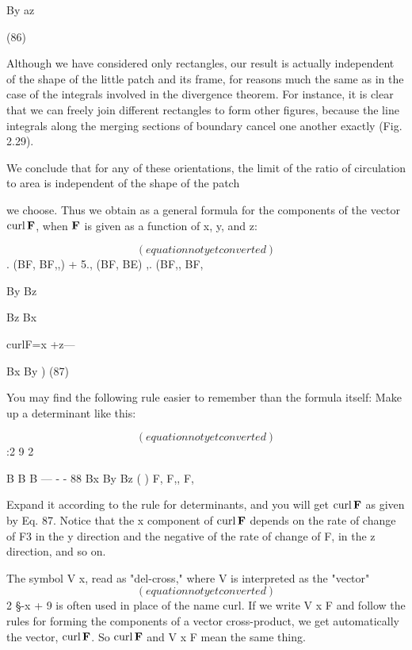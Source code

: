 {By az

(86)

Although we have considered only rectangles, our result is actually
independent of the shape of the little patch and its frame, for reasons
much the same as in the case of the integrals involved in the divergence
theorem. For instance, it is clear that we can freely join different
rectangles to form other figures, because the line integrals
along the merging sections of boundary cancel one another exactly
(Fig. 2.29).

We conclude that for any of these orientations, the limit of the
ratio of circulation to area is independent of the shape of the patch

 

we choose. Thus we obtain as a general formula for the components
of the vector $\operatorname{curl}\mathbf{F}$, when $\mathbf{F}$ is given as a function of x, y, and z:

\begin{equation}
(equation not yet converted)
\end{equation}
. (BF, BF,,) + 5., (BF, BE) ,. (BF,, BF,

By Bz

Bz Bx

curlF=x +z---

Bx By ) (87)

You may find the following rule easier to remember than the formula
itself: Make up a determinant like this:

\begin{equation}
(equation not yet converted)
\end{equation}
:2 9 2

B B B
--- - - 88
Bx By Bz ( )
F, F,, F,

Expand it according to the rule for determinants, and you will get
$\operatorname{curl}\mathbf{F}$ as given by Eq. 87. Notice that the x component of $\operatorname{curl}\mathbf{F}$
depends on the rate of change of F3 in the y direction and the negative
of the rate of change of F, in the z direction, and so on.

The symbol V x, read as "del-cross," where V is interpreted as the
"vector"
\begin{equation}
(equation not yet converted)
\end{equation}
2 §-x + 9%
is often used in place of the name curl. If we write V x F and follow
the rules for forming the components of a vector cross-product, we
get automatically the vector, $\operatorname{curl}\mathbf{F}$. So $\operatorname{curl}\mathbf{F}$ and V x F mean the
same thing.

}
